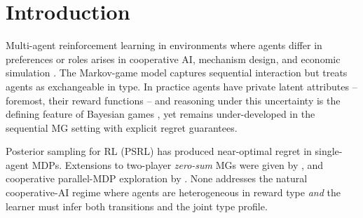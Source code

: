 \section{Introduction}
\label{sec:intro}

Multi-agent reinforcement learning in environments where agents differ in preferences or roles arises in cooperative AI, mechanism design, and economic simulation \citep{zhang2021multi,leibo2017multi,perolat2017multi}. The Markov-game model \citep{shapley1953stochastic,littman1994markov} captures sequential interaction but treats agents as exchangeable in type. In practice agents have private latent attributes -- foremost, their reward functions -- and reasoning under this uncertainty is the defining feature of Bayesian games \citep{harsanyi1968games}, yet remains under-developed in the sequential MG setting with explicit regret guarantees.

Posterior sampling for RL (PSRL) \citep{strens2000bayesian,osband2013more,agrawal2017optimistic,osband2017posterior} has produced near-optimal regret in single-agent MDPs. Extensions to two-player \emph{zero-sum} MGs were given by \citet{jafarnia2021learning,xiong2022self,yueh2026bayesian}, and cooperative parallel-MDP exploration by \citet{hsu2024randomized}. None addresses the natural cooperative-AI regime where agents are heterogeneous in reward type \emph{and} the learner must infer both transitions and the joint type profile.


